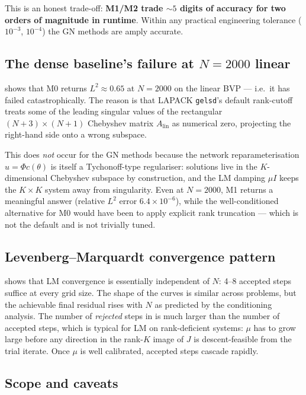 \documentclass[11pt,a4paper]{article}
\newcommand{\Alin}{A_{\mathrm{lin}}}
\begin{document}
This is an honest trade-off: \textbf{M1/M2 trade $\sim 5$ digits of accuracy
for two orders of magnitude in runtime}. Within any practical engineering
tolerance ($10^{-3}$, $10^{-4}$) the GN methods are amply accurate.

\subsection{The dense baseline's failure at $N = 2000$ linear}

 shows that M0 returns $L^{2}\approx 0.65$ at
$N=2000$ on the linear BVP — i.e.\ it has failed catastrophically. The reason
is that LAPACK \texttt{gelsd}'s default rank-cutoff treats some of the leading
singular values of the rectangular $(N+3)\times(N+1)$ Chebyshev matrix
$\Alin$ as numerical zero, projecting the right-hand side onto a wrong subspace.

This does \emph{not} occur for the GN methods because the network
reparameterisation $u = \Phi c(\theta)$ is itself a Tychonoff-type regulariser:
solutions live in the $K$-dimensional Chebyshev subspace by construction,
and the LM damping $\mu I$ keeps the $K\times K$ system away from singularity.
Even at $N = 2000$, M1 returns a meaningful answer (relative $L^{2}$ error
$6.4\times 10^{-6}$), while the well-conditioned alternative for M0 would have
been to apply explicit rank truncation — which is not the default and is not
trivially tuned.

\subsection{Levenberg--Marquardt convergence pattern}

 shows that LM convergence is essentially independent of
$N$: 4--8 accepted steps suffice at every grid size. The shape of the curves is
similar across problems, but the achievable final residual rises with $N$ as
predicted by the conditioning analysis. The number of \emph{rejected} steps in
 is much larger than the number of accepted steps, which is
typical for LM on rank-deficient systems: $\mu$ has to grow large before any
direction in the rank-$K$ image of $J$ is descent-feasible from the trial
iterate. Once $\mu$ is well calibrated, accepted steps cascade rapidly.

\subsection{Scope and caveats}
\label{sec:caveats}
\end{document}
